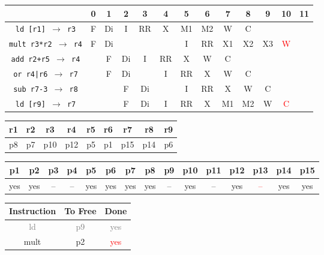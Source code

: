 \documentclass[12pt]{article}
\begin{document}
\begin{enumerate}
\begin{table}[H]
\begin{tabular}{|c|c|c|c|c|c|c|c|c|c|c|c|c|}
					\hline
					 & 0 & 1 & 2 & 3 & 4 & 5 & 6 & 7 & 8 & 9 & 10 & 11\\
					\hline
					\texttt{ld [r1] $\rightarrow$ r3} & F & Di & I & RR & X & M1 & M2 & W & C &  &  &\\
					\hline
					\texttt{mult r3*r2 $\rightarrow$ r4} & F & Di &  &  &  & I & RR & X1 & X2 & X3 & \textcolor{red}{W} &\\
					\hline
					\texttt{add r2+r5 $\rightarrow$ r4} &  & F & Di & I & RR & X & W & C &  &  &  &\\
					\hline
					\texttt{or r4|r6 $\rightarrow$ r7} &  & F & Di &  & I & RR & X & W & C &  &  &\\
					\hline
					\texttt{sub r7-3 $\rightarrow$ r8} &  &  & F & Di &  & I & RR & X & W & C &  &\\
					\hline
					\texttt{ld [r9] $\rightarrow$ r7} &  &  & F & Di & I & RR & X & M1 & M2 & W & \textcolor{red}{C} &\\
					\hline 
				\end{tabular}
			\end{table}
			\begin{table}[H]
				\begin{tabular}{|c|c|c|c|c|c|c|c|c|}
					\hline
					r1 & r2 & r3 & r4 & r5 & r6 & r7 & r8 & r9\\
					\hline
					p8 & p7 & p10 & p12 & p5 & p1 & p15 & p14 & p6\\
					\hline
				\end{tabular}
			\end{table}
			\begin{table}[H]
				\begin{tabular}{|c|c|c|c|c|c|c|c|c|c|c|c|c|c|c|}
					\hline
					p1 & p2 & p3 & p4 & p5 & p6 & p7 & p8 & p9 & p10 & p11 & p12 & p13 & p14 & p15\\
					\hline
					yes & yes & -- & -- & yes & yes & yes & yes & -- & yes & -- & yes & \textcolor{red}{--} & yes & yes\\
					\hline
				\end{tabular}
			\end{table}
			\begin{table}[H]
				\begin{tabular}{|c|c|c|}
					\hline
					Instruction & To Free & Done\\
					\hline
					\textcolor{gray}{ld} & \textcolor{gray}{p9} & \textcolor{gray}{yes}\\
					\hline
					mult & p2 & \textcolor{red}{yes}\\
					\hline

\end{tabular}
\end{table}
\end{enumerate}
\end{document}
